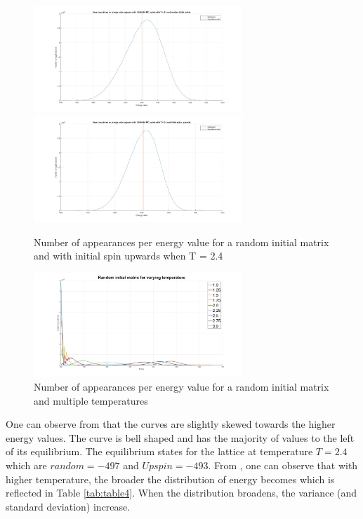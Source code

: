\documentclass[10pt,a4paper]{article}
\begin{document}
\begin{figure}[H]
\centerline{
\includegraphics[width=0.7\textwidth]{energyappearanceT24random}
\includegraphics[width=0.7\textwidth]{energyappearanceT24upspin}
}
\caption{Number of appearances per energy value for a random initial matrix and with initial spin upwards when T = 2.4}
\label{fig:energyappearance}
\end{figure}
\begin{figure}[H]
\centerline{
\includegraphics[width=0.7\textwidth]{energyappearanceALL}
}
\caption{Number of appearances per energy value for a random initial matrix and multiple temperatures}
\label{fig:energyappearanceALL}
\end{figure}

\noindent One can observe from  that the curves are slightly skewed towards the higher energy values. The curve is bell shaped and has the majority of values to the left of its equilibrium. The equilibrium states for the lattice at temperature $T = 2.4$ which are $random = -497$ and $Up spin = -493$. From , one can observe that with higher temperature, the broader the distribution of energy becomes which is reflected in Table \ref{tab:table4}. When the distribution broadens, the variance (and standard deviation) increase.\\
\end{document}
